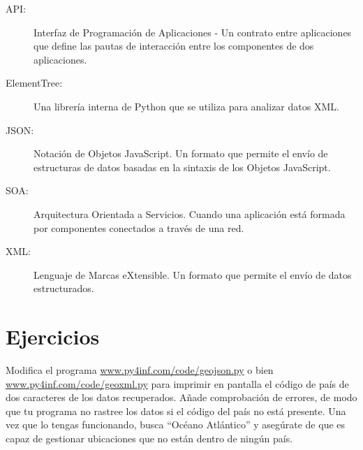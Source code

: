\begin{description}

\item[API:] Interfaz de Programación de Aplicaciones - Un contrato entre
aplicaciones que define las pautas de interacción entre
los componentes de dos aplicaciones.

\item[ElementTree:] Una librería interna de Python que se utiliza
para analizar datos XML.

\item[JSON:] Notación de Objetos JavaScript. Un formato que permite
el envío de estructuras de datos basadas en la sintaxis de los Objetos
JavaScript.

\item[SOA:] Arquitectura Orientada a Servicios. Cuando una aplicación
está formada por componentes conectados a través de una red.

\item[XML:] Lenguaje de Marcas eXtensible. Un formato que permite
el envío de datos estructurados.

\end{description}

\section{Ejercicios}

\begin{ex}
Modifica el programa
\url{www.py4inf.com/code/geojson.py} o bien
\url{www.py4inf.com/code/geoxml.py} para imprimir en pantalla el
código de país de dos caracteres de los datos recuperados.
Añade comprobación de errores, de modo que tu programa no rastree los datos
si el código del país no está presente. Una vez que lo tengas
funcionando, busca ``Océano Atlántico'' y asegúrate
de que es capaz de gestionar ubicaciones que no están dentro de ningún país.
\end{ex}
